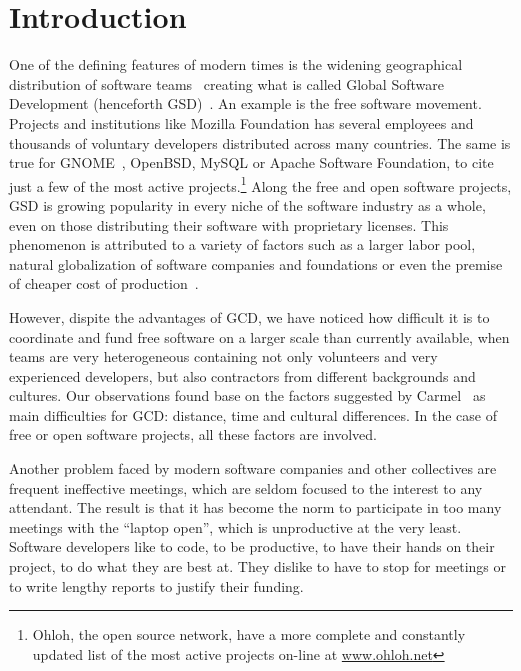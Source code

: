 \documentclass[letterpaper]{article}
\newcommand{\indraftnote}[1]{\textcolor{blue}{\texttt{\footnotesize[#1]}}}
\newcommand{\todo}[1]{\indraftnote{todo: #1}}
\begin{document}


\section{Introduction}

One of the defining features of modern times is the widening
geographical distribution of software teams~\cite{last2003} creating
what is called Global Software Development (henceforth
GSD)~\cite{german2003}. An example is the free software
movement. Projects and institutions like Mozilla Foundation has several
employees and thousands of voluntary developers distributed across
many countries. The same is true for GNOME~\cite{german2003}, OpenBSD,
MySQL or Apache Software Foundation, to cite just a few of the most active
projects.\footnote{Ohloh, the open source network, have a more complete
  and constantly updated list of the most active projects on-line at
  \url{www.ohloh.net}} Along the free and open software
projects, GSD is growing popularity in every niche of the software
industry as a whole, even on those distributing their software with
proprietary licenses. This phenomenon is attributed to a variety of factors
such as a larger labor pool, natural globalization of software companies
and foundations or even the premise of cheaper cost of
production~\cite{komi2005}.

However, dispite the advantages of GCD, we have noticed how
difficult it is to coordinate and fund free software on a larger scale
than currently available, when teams are very heterogeneous containing
not only volunteers and very experienced developers, but also
contractors from different backgrounds and cultures. Our observations
found base on the factors suggested by Carmel~\cite{carmel1999} as
main difficulties for GCD: distance, time and cultural differences. In
the case of free or open software projects, all these factors are
involved.

Another problem faced by modern software companies and other
collectives are frequent ineffective meetings, which are seldom
focused to the interest to any attendant. The result is that it has
become the norm to participate in too many meetings with the ``laptop
open'', which is unproductive at the very least. Software developers
like to code, to be productive, to have their hands on their project,
to do what they are best at. They dislike to have to stop for meetings
or to write lengthy reports to justify their funding.
\end{document}
